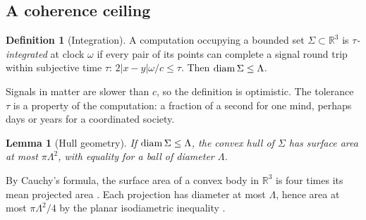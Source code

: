 \documentclass[11pt,a4paper]{article}
\newtheorem{lemma}[proposition]{Lemma}
\theoremstyle{definition}
\newtheorem{definition}[proposition]{Definition}
\begin{document}
\subsection{A coherence ceiling}
\begin{definition}[Integration]
\label{def:integration}
A computation occupying a bounded set $\Sigma\subset\mathbb R^3$ is
\emph{$\tau$-integrated} at clock $\omega$ if every pair of its points can
complete a signal round trip within subjective time $\tau$:
$2|x-y|\omega/c\leq\tau$. Then ${\rm diam}\,\Sigma\leq\Lambda$.
\end{definition}
Signals in matter are slower than $c$, so the definition is optimistic. The
tolerance $\tau$ is a property of the computation: a fraction of a second for
one mind, perhaps days or years for a coordinated society.

\begin{lemma}[Hull geometry]
\label{lem:hull}
If ${\rm diam}\,\Sigma\leq\Lambda$, the convex hull of $\Sigma$ has surface
area at most $\pi\Lambda^2$, with equality for a ball of diameter $\Lambda$.
\end{lemma}
\noindent By Cauchy's formula, the surface area of a convex body in
$\mathbb R^3$ is four times its mean projected area \citep{Schneider2014}. Each
projection has diameter at most $\Lambda$, hence area at most $\pi\Lambda^2/4$
by the planar isodiametric inequality \citep{Bieberbach1915}.
\end{document}
